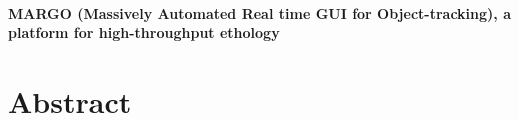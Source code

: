 \documentclass[10pt]{article}
\begin{document}
	
\renewcommand*\rmdefault{phv}
\selectfont

\newcommand{\avg}[1]{\left<{#1}\right>}
\newcommand{\hence}{\hspace{1cm}\Longrightarrow\hspace{1cm}}
\renewcommand{\ni}{\noindent}
\newcommand{\din}{\indent \indent}
\newcommand{\mni}{\medskip \noindent}
\newcommand{\bni}{\bigskip \noindent}
\newcommand{\sni}{\smallskip \noindent}
\newcommand{\pr}{{\rm Prob}}
\newcommand{\mon}{\begin{displaymath}}
\newcommand{\moff}{\end{displaymath}}
\newcommand{\sumi}[1]{\sum_{{#1}=-\infty}^{\infty}}
\renewcommand{\b}[1]{\mbox{\boldmath ${#1}$}}
\newcommand{\sumy}{\sum_{\b{y}}}
\newcommand{\sumz}{\sum_{\b{z}}}
\newcommand{\pd}[2]{\frac{\partial {#1}}{\partial {#2}}}
\newcommand{\od}[2]{\frac{d {#1}}{d {#2}}}
\newcommand{\odat}[3]{\left. \frac{d {#1}}{d {#2}} \right|_{#3}}
\newcommand{\inti}{\int_{-\infty}^{\infty}}
\newcommand{\eon}{\begin{equation}}
\newcommand{\eoff}{\end{equation}}
\newcommand{\eaon}{\begin{eqnarray}}
\newcommand{\eaoff}{\end{eqnarray}}
\newcommand{\e}[1]{\times 10^{#1}}
\newcommand{\chem}[2]{{}^{#2} \mathrm{#1}}
\renewcommand{\sb}{s}
\newcommand{\s}{s}
\newcommand{\zetaexp}{\left( \zeta e^{q \s t} \right)}
\newcommand{\taunuc}{\tau_{nuc}}
\newcommand{\eq}[1]{Eq. (\ref{#1})}\
\newcommand{\ev}[1]{\langle #1 \rangle}
\newcommand*\mean[1]{${\bar{#1}}$}



\begin{center}
	\LARGE\textbf{MARGO (Massively Automated Real time GUI for Object-tracking), a platform for high-throughput ethology}\\
	\large\textbf{}
\end{center}

\section*{Abstract}
\end{document}
